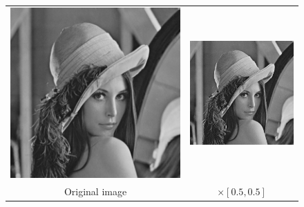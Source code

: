 \documentclass[11pt,a4paper]{article}
\begin{document}
\begin{figure}[!htbp]
	\centering
	\begin{tabular}{cc}
	\includegraphics[scale=0.3]{pro6/scale/originScale}&
	\includegraphics[scale=0.3]{pro6/scale/scale_0_5_0_5}\\
	Original image& $\times [0.5,0.5]$\\

\end{tabular}
\end{figure}
\end{document}
